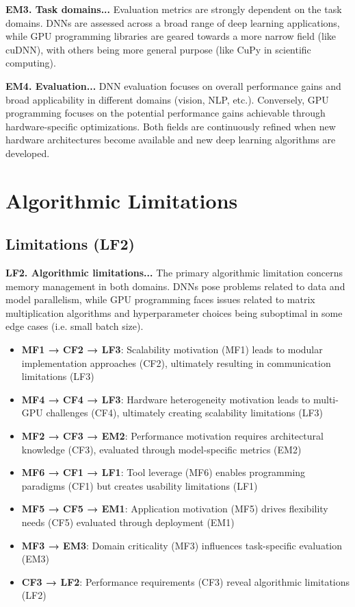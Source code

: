 \textbf{EM3. Task domains...}
Evaluation metrics are strongly dependent on the task domains. DNNs are assessed across
a broad range of deep learning applications, while GPU programming libraries are geared towards
a more narrow field  (like cuDNN), with others being more general purpose (like CuPy in scientific
computing).

\textbf{EM4. Evaluation...}
DNN evaluation focuses on overall performance gains and broad applicability in different domains (vision,
NLP, etc.). Conversely, GPU programming focuses on the potential performance gains achievable through
hardware-specific optimizations. Both fields are continuously refined when new hardware architectures
become available and new deep learning algorithms are developed.

\section{Algorithmic Limitations}
\subsection*{Limitations (LF2)}
\textbf{LF2. Algorithmic limitations...}
The primary algorithmic limitation concerns memory management in both domains.
DNNs pose problems related to data and model parallelism, while GPU programming faces issues
related to matrix multiplication algorithms and hyperparameter choices being suboptimal in some edge cases
(i.e. small batch size).

\begin{itemize}
	\item \textbf{MF1 → CF2 → LF3}: Scalability motivation (MF1) leads to modular implementation approaches (CF2), ultimately resulting in communication limitations (LF3)
	\item \textbf{MF4 → CF4 → LF3}: Hardware heterogeneity motivation leads to multi-GPU challenges (CF4), ultimately creating scalability limitations (LF3)
	\item \textbf{MF2 → CF3 → EM2}: Performance motivation requires architectural knowledge (CF3), evaluated through model-specific metrics (EM2)
	\item \textbf{MF6 → CF1 → LF1}: Tool leverage (MF6) enables programming paradigms (CF1) but creates usability limitations (LF1)
	\item \textbf{MF5 → CF5 → EM1}: Application motivation (MF5) drives flexibility needs (CF5) evaluated through deployment (EM1)
	\item \textbf{MF3 → EM3}: Domain criticality (MF3) influences task-specific evaluation (EM3)
	\item \textbf{CF3 → LF2}: Performance requirements (CF3) reveal algorithmic limitations (LF2)
\end{itemize}

